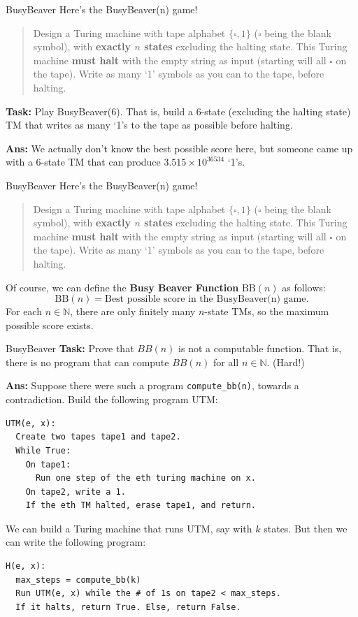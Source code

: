 \documentclass{beamer}
\newcommand{\N}{{\mathbb N}}
\begin{document}
\begin{frame}{BusyBeaver}
Here's the BusyBeaver(n) game!
\begin{quote}
    Design a Turing machine with tape alphabet $\{\square, 1\}$ ($\square$ being the blank symbol), with \textbf{exactly $n$ states} excluding the halting state. This Turing machine \textbf{must halt} with the empty string as input (starting will all $\square$ on the tape). Write as many `1' symbols as you can to the tape, before halting.
\end{quote}

\textbf{Task:} Play BusyBeaver(6). That is, build a 6-state (excluding the halting state) TM that writes as many `1's to the tape as possible before halting.

\pause

\textbf{Ans:} We actually don't know the best possible score here, but someone came up with a $6$-state TM that can produce $3.515 \times 10^{36534}$ `1's.
\end{frame}

\begin{frame}{BusyBeaver}
Here's the BusyBeaver(n) game!
\begin{quote}
    Design a Turing machine with tape alphabet $\{\square, 1\}$ ($\square$ being the blank symbol), with \textbf{exactly $n$ states} excluding the halting state. This Turing machine \textbf{must halt} with the empty string as input (starting will all $\square$ on the tape). Write as many `1' symbols as you can to the tape, before halting.
\end{quote}

Of course, we can define the \textbf{Busy Beaver Function} $\mathrm{BB}(n)$ as follows:
$$\mathrm{BB}(n) = \text{Best possible score in the BusyBeaver(n) game}.$$
For each $n \in \N$, there are only finitely many $n$-state TMs, so the maximum possible score exists.
\end{frame}

\begin{frame}[fragile]{BusyBeaver}
\textbf{Task:} Prove that $BB(n)$ is not a computable function. That is, there is no program that can compute $BB(n)$ for all $n \in \N$. (Hard!)

\pause

\textbf{Ans:} Suppose there were such a program \texttt{compute\_bb(n)}, towards a contradiction. Build the following program UTM:

\begin{verbatim}
UTM(e, x):
  Create two tapes tape1 and tape2.
  While True:
    On tape1:
      Run one step of the eth turing machine on x. 
    On tape2, write a 1.
    If the eth TM halted, erase tape1, and return.
\end{verbatim}

We can build a Turing machine that runs UTM, say with $k$ states. But then we can write the following program:
\begin{verbatim}
H(e, x):
  max_steps = compute_bb(k)
  Run UTM(e, x) while the # of 1s on tape2 < max_steps.
  If it halts, return True. Else, return False.
\end{verbatim}

\end{frame}
\end{document}
